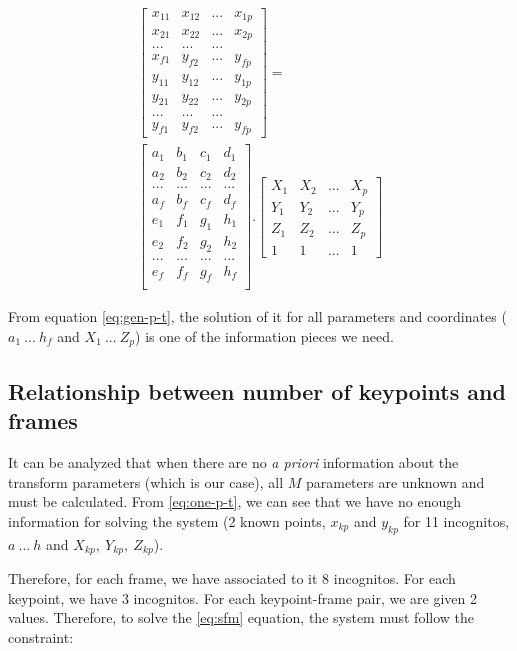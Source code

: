 \documentclass[]{IEEEtran}
\begin{document}
\begin{equation}
\begin{split}
    \begin{bmatrix}
        x_{11} & x_{12} & ... & x_{1p}
        \\ x_{21} & x_{22} & ... & x_{2p} 
        \\ ... & ... & ... 
        \\ x_{f1} & y_{f2} & ... & y_{fp}
        \\ y_{11} & y_{12} & ... & y_{1p}
        \\ y_{21} & y_{22} & ... & y_{2p} 
        \\ ... & ... & ... 
        \\ y_{f1} & y_{f2} & ... & y_{fp}
    \end{bmatrix} = \\
    \begin{bmatrix}
        a_{1} & b_{1} & c_{1} & d_{1} \\
        a_{2} & b_{2} & c_{2} & d_{2} \\
        ... & ... & ... & ... \\
        a_{f} & b_{f} & c_{f} & d_{f} \\
        e_{1} & f_{1} & g_{1} & h_{1} \\
        e_{2} & f_{2} & g_{2} & h_{2} \\
        ... & ... & ... & ... \\
        e_{f} & f_{f} & g_{f} & h_{f} \\
    \end{bmatrix}.
    \begin{bmatrix}
        X_{1} & X_{2} & ... & X_{p}\\
        Y_{1} & Y_{2} & ... & Y_{p}\\
        Z_{1} & Z_{2} & ... & Z_{p}\\
        1 & 1 & ... & 1
    \end{bmatrix}
\end{split}
    \label{eq:gen-p-t}
\end{equation}

From equation \ref{eq:gen-p-t}, the solution of it for all parameters and coordinates ($a_{1}\ ...\ h_{f}$ and $X_{1}\ ...\ Z_{p}$) is one of the information pieces we need.

\subsection{Relationship between number of keypoints and frames}
\par It can be analyzed that when there are no \textit{a priori} information about the transform parameters (which is our case), all $M$ parameters are unknown and must be calculated. From \ref{eq:one-p-t}, we can see that we have no enough information for solving the system (2 known points, $x_{kp}$ and $y_{kp}$ for 11 incognitos, $a\ ...\ h$ and $X_{kp},\ Y_{kp},\ Z_{kp}$).
\par Therefore, for each frame, we have associated to it 8 incognitos. For each keypoint, we have 3 incognitos. For each keypoint-frame pair, we are given 2 values. Therefore, to solve the \ref{eq:sfm} equation, the system must follow the constraint:
\end{document}
